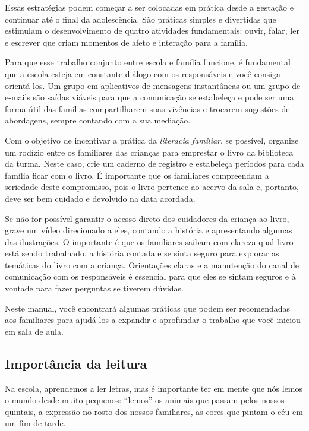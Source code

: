 \documentclass[11pt]{extarticle}
\begin{document}
Essas estratégias podem começar a ser colocadas em prática desde a 
gestação e continuar até o final da adolescência. São práticas simples e divertidas 
que estimulam o desenvolvimento de quatro atividades fundamentais: ouvir, falar, 
ler e escrever que criam momentos de afeto e interação para a família. 

Para que esse trabalho conjunto entre escola e família funcione, é 
fundamental que a escola esteja em constante diálogo com os responsáveis e 
você consiga orientá-los. Um grupo em aplicativos de mensagens instantâneas ou um 
grupo de e-mails são saídas viáveis para que a comunicação se estabeleça e pode ser 
uma forma útil das famílias compartilharem suas vivências e trocarem sugestões 
de abordagens, sempre contando com a sua mediação. 

Com o objetivo de incentivar 
a prática da \textit{literacia familiar}, se possível, organize um rodízio entre os familiares 
das crianças para emprestar o livro da biblioteca da turma. Neste caso, crie um caderno 
de registro e estabeleça períodos para cada família ficar com o livro. É importante 
que os familiares compreendam a seriedade deste compromisso, pois o livro pertence 
ao acervo da sala e, portanto, deve ser bem cuidado e devolvido na data acordada. 

Se não for possível garantir o acesso direto dos cuidadores da criança ao livro, 
grave um vídeo direcionado a eles, contando a história e apresentando algumas 
das ilustrações. O importante é que os familiares saibam com clareza qual livro 
está sendo trabalhado, a história contada e se sinta seguro para explorar as temáticas 
do livro com a criança. Orientações claras e a manutenção do canal de comunicação com 
os responsáveis é essencial para que eles se sintam seguros e à vontade para fazer perguntas 
se tiverem dúvidas. 

Neste manual, você encontrará algumas práticas que podem ser 
recomendadas aos familiares para ajudá-los a expandir e aprofundar o trabalho 
que você iniciou em sala de aula.


\subsection{Importância da leitura}
Na escola, aprendemos a ler letras, mas é importante ter em mente que nós 
lemos o mundo desde muito pequenos: “lemos” os animais que passam pelos nossos 
quintais, a expressão no rosto dos nossos familiares, as cores que pintam o céu 
em um fim de tarde. 
\end{document}
